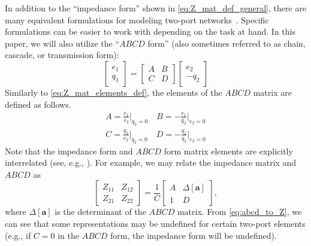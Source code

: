 \documentclass[lettersize,journal]{IEEEtran}
\begin{document}
In addition to the ``impedance form'' shown in \eqref{eq:Z_mat_def_general}, there are many equivalent formulations for modeling two-port networks~\cite{CircuitFundamental}.
Specific formulations can be easier to work with depending on the task at hand.
In this paper, we will also utilize the ``$ABCD$ form'' (also sometimes referred to as chain, cascade, or transmission form):
%
\begin{equation}
        \label{eq:abcd_mat_def_general}
        \begin{bmatrix} e_1 \\ q_1 \end{bmatrix}
        = 
        \begin{bmatrix} A & B \\ C & D \end{bmatrix}
        \begin{bmatrix} e_2 \\ - q_2 \end{bmatrix}
\end{equation}
%
Similarly to \eqref{eq:Z_mat_elements_def}, the elements of the $ABCD$ matrix are defined as follows.
%
\begin{subequations} \label{eq:abcd_mat_elements_def}
        \begin{align}
                A = \frac{e_1}{e_2} \bigg \vert_{q_2=0}  \quad
                B = - \frac{e_1}{q_2} \bigg \vert_{e_2=0}  \\[1em]
                C = \frac{q_1}{e_2} \bigg \vert_{q_2=0}  \quad
                D = - \frac{q_1}{q_2} \bigg \vert_{e_2=0} 
        \end{align}
\end{subequations}
%
Note that the impedance form and $ABCD$ form matrix elements are explicitly interrelated (see, e.g., \cite{CircuitFundamental}).
For example, we may relate the impedance matrix and $ABCD$ as
%
\begin{equation}
        \begin{bmatrix}
                Z_{11} & Z_{12} \\ Z_{21} & Z_{22}
        \end{bmatrix}
        =
        \frac{1}{C}
        \begin{bmatrix}
                A & \Delta \left[ \mathbf{a} \right] \\ 1 & D
        \end{bmatrix} ,
\label{eq:abcd_to_Z}
\end{equation}
%
where $\Delta \left[ \mathbf{a} \right]$ is the determinant of the $ABCD$ matrix.
From \eqref{eq:abcd_to_Z}, we can see that some representations may be undefined for certain two-port elements (e.g., if $C=0$ in the $ABCD$ form, the impedance form will be undefined).
\end{document}
